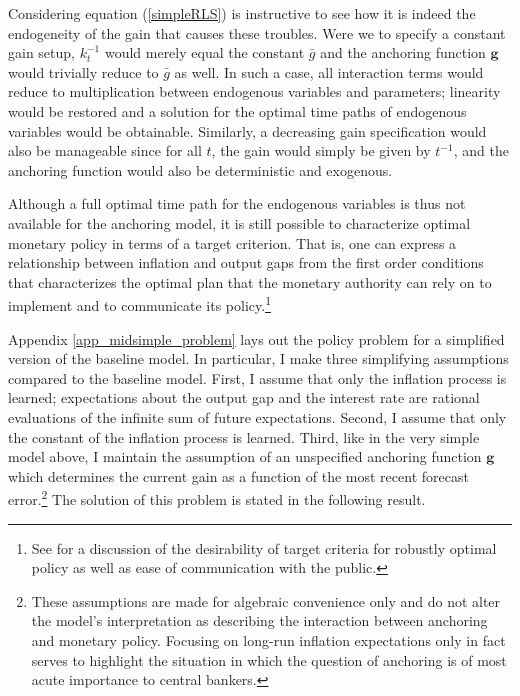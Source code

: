 \documentclass[11pt]{article}
\renewcommand{\[}{\begin{equation}}
\renewcommand{\]}{\end{equation}}
\begin{document}
Considering equation (\ref{simpleRLS}) is instructive to see how it is indeed the endogeneity of the gain that causes these troubles. Were we to specify a constant gain setup, $k_t^{-1}$ would merely equal the constant $\bar{g}$ and the anchoring function $\mathbf{g}$ would trivially reduce to $\bar{g}$ as well. In such a case, all interaction terms would reduce to multiplication between endogenous variables and parameters; linearity would be restored and a solution for the optimal time paths of endogenous variables would be obtainable. Similarly, a decreasing gain specification would also be manageable since for all $t$, the gain would simply be given by $t^{-1}$, and the anchoring function would also be deterministic and exogenous. 

Although a full optimal time path for the endogenous variables is thus not available for the anchoring model, it is still possible to characterize optimal monetary policy in terms of a target criterion. That is, one can express a relationship between inflation and output gaps from the first order conditions that characterizes the optimal plan that the monetary authority can rely on to implement and to communicate its policy.\footnote{See \cite{woodford2011interest} for a discussion of the desirability of target criteria for robustly optimal policy as well as ease of communication with the public.}  

Appendix \ref{app_midsimple_problem} lays out the policy problem for a simplified version of the baseline model. In particular, I make three simplifying assumptions compared to the baseline model. First, I assume that only the  inflation process is learned; expectations about the output gap and the interest rate are rational evaluations of the infinite sum of future expectations. Second, I assume that only the constant of the inflation process is learned. Third, like in the very simple model above, I maintain the assumption of an unspecified anchoring function $\mathbf{g}$ which determines the current gain as a function of the most recent forecast error.\footnote{These assumptions are made for algebraic convenience only and do not alter the model's interpretation as describing the interaction between anchoring and monetary policy. Focusing on long-run inflation expectations only in fact serves to highlight the situation in which the question of anchoring is of most acute importance to central bankers.} The solution of this problem is stated in the following result.
\end{document}
